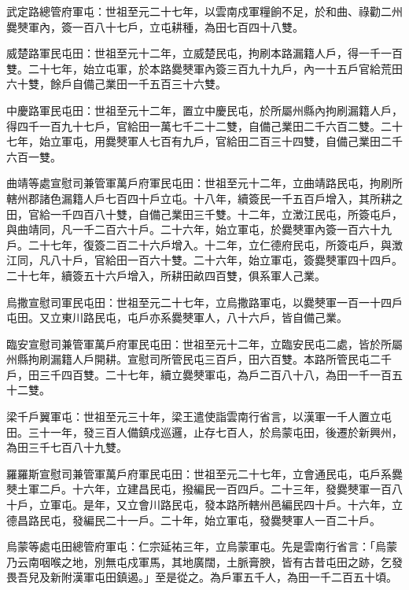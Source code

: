 \begin{pinyinscope}
 武定路總管府軍屯：世祖至元二十七年，以雲南戍軍糧餉不足，於和曲、祿勸二州爨僰軍內，簽一百八十七戶，立屯耕種，為田七百四十八雙。



 威楚路軍民屯田：世祖至元十二年，立威楚民屯，拘刷本路漏籍人戶，得一千一百雙。二十七年，始立屯軍，於本路爨僰軍內簽三百九十九戶，內一十五戶官給荒田六十雙，餘戶自備己業田一千五百三十六雙。



 中慶路軍民屯田：世祖至元十二年，置立中慶民屯，於所屬州縣內拘刷漏籍人戶，得四千一百九十七戶，官給田一萬七千二十二雙，自備己業田二千六百二雙。二十七年，始立軍屯，用爨僰軍人七百有九戶，官給田二百三十四雙，自備己業田二千六百一雙。



 曲靖等處宣慰司兼管軍萬戶府軍民屯田：世祖至元十二年，立曲靖路民屯，拘刷所轄州郡諸色漏籍人戶七百四十戶立屯。十八年，續簽民一千五百戶增入，其所耕之田，官給一千四百八十雙，自備己業田三千雙。十二年，立澂江民屯，所簽屯戶，與曲靖同，凡一千二百六十戶。二十六年，始立軍屯，於爨僰軍內簽一百六十九戶。二十七年，復簽二百二十六戶增入。十二年，立仁德府民屯，所簽屯戶，與澂江同，凡八十戶，官給田一百六十雙。二十六年，始立軍屯，簽爨僰軍四十四戶。二十七年，續簽五十六戶增入，所耕田畝四百雙，俱系軍人己業。



 烏撒宣慰司軍民屯田：世祖至元二十七年，立烏撒路軍屯，以爨僰軍一百一十四戶屯田。又立東川路民屯，屯戶亦系爨僰軍人，八十六戶，皆自備己業。



 臨安宣慰司兼管軍萬戶府軍民屯田：世祖至元十二年，立臨安民屯二處，皆於所屬州縣拘刷漏籍人戶開耕。宣慰司所管民屯三百戶，田六百雙。本路所管民屯二千戶，田三千四百雙。二十七年，續立爨僰軍屯，為戶二百八十八，為田一千一百五十二雙。



 梁千戶翼軍屯：世祖至元三十年，梁王遣使詣雲南行省言，以漢軍一千人置立屯田。三十一年，發三百人備鎮戍巡邏，止存七百人，於烏蒙屯田，後遷於新興州，為田三千七百八十九雙。



 羅羅斯宣慰司兼管軍萬戶府軍民屯田：世祖至元二十七年，立會通民屯，屯戶系爨僰土軍二戶。十六年，立建昌民屯，撥編民一百四戶。二十三年，發爨僰軍一百八十戶，立軍屯。是年，又立會川路民屯，發本路所轄州邑編民四十戶。十六年，立德昌路民屯，發編民二十一戶。二十年，始立軍屯，發爨僰軍人一百二十戶。



 烏蒙等處屯田總管府軍屯：仁宗延祐三年，立烏蒙軍屯。先是雲南行省言：「烏蒙乃云南咽喉之地，別無屯戍軍馬，其地廣闊，土脈膏腴，皆有古昔屯田之跡，乞發畏吾兒及新附漢軍屯田鎮遏。」至是從之。為戶軍五千人，為田一千二百五十頃。




\end{pinyinscope}
